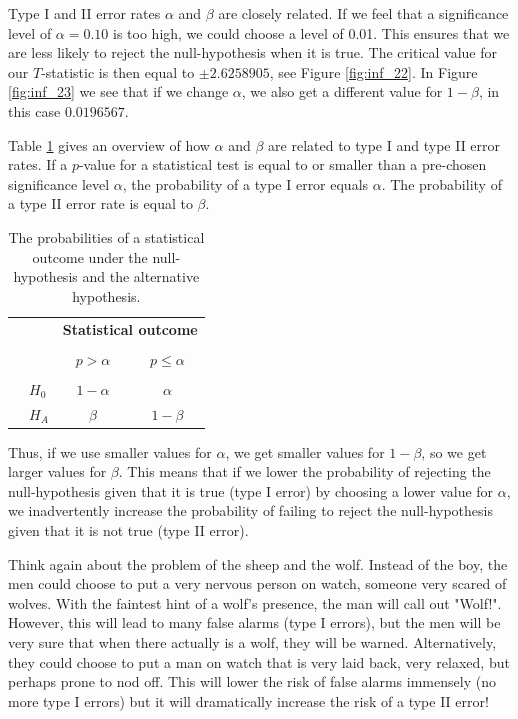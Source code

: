 \documentclass[]{report}\usepackage[]{graphicx}\usepackage[]{color}
\begin{document}
Type I and II error rates $\alpha$ and $\beta$ are closely related. If we feel that a significance level of $\alpha=0.10$ is too high, we could choose a level of 0.01. This ensures that we are less likely to reject the null-hypothesis when it is true. The critical value for our $T$-statistic is then equal to $\pm  2.6258905$, see Figure \ref{fig:inf_22}. In Figure \ref{fig:inf_23} we see that if we change $\alpha$, we also get a different value for $1-\beta$, in this case $0.0196567$.

Table \ref{fig:probs} gives an overview of how $\alpha$ and $\beta$ are related to type I and type II error rates. If a $p$-value for a statistical test is equal to or smaller than a pre-chosen significance level $\alpha$, the probability of a type I error equals $\alpha$. The probability of a type II error rate is equal to $\beta$. 

\begin{table}[ht]
\centering
\begin{tabular}{l l c c}
& & \multicolumn{2}{c}{\textbf{Statistical outcome}} \\
  \cline{3-4}
\vspace{-3.7mm} \\
& & $p > \alpha$  &  $p \leq \alpha$ \\
  \cline{2-4}
\vspace{-3.7mm} \\
& $H_0$ & $1-\alpha$ &  $\alpha$ \\
\raisebox{1.5ex}{\textbf{Truth}} & $H_A$  & $\beta$ & $1-\beta$ \\
  \cline{2-4}
\end{tabular}
\caption{The probabilities of a statistical outcome under the null-hypothesis and the alternative hypothesis.}
\label{fig:probs}
\end{table}


Thus, if we use smaller values for $\alpha$, we get smaller values for $1-\beta$, so we get larger values for $\beta$. This means that if we lower the probability of rejecting the null-hypothesis given that it is true (type I error) by choosing a lower value for $\alpha$, we inadvertently increase the probability of failing to reject the null-hypothesis given that it is not true (type II error). 

Think again about the problem of the sheep and the wolf. Instead of the boy, the men could choose to put a very nervous person on watch, someone very scared of wolves. With the faintest hint of a wolf's presence, the man will call out "Wolf!". However, this will lead to many false alarms (type I errors), but the men will be very sure that when there actually is a wolf, they will be warned. Alternatively, they could choose to put a man on watch that is very laid back, very relaxed, but perhaps prone to nod off. This will lower the risk of false alarms immensely (no more type I errors) but it will dramatically increase the risk of a type II error!
\end{document}

